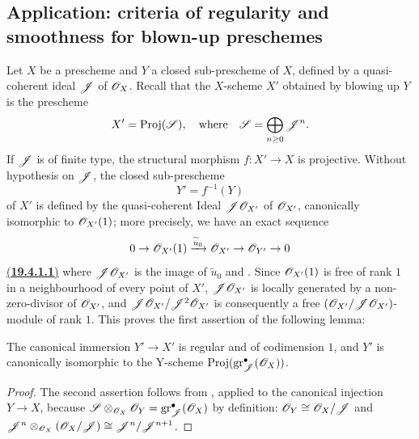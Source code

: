 \subsection{Application: criteria of regularity and smoothness for blown-up preschemes}
\label{subsection:IV.19.4}


\begin{env}[19.4.1]
\label{IV.19.4.1}
Let $X$ be a prescheme and $Y$ a closed sub-prescheme of $X$, defined by a quasi-coherent ideal $\mathscr{J}$ of $\mathscr{O}_X$.
Recall  that the $X$-scheme $X'$ obtained by blowing up $Y$ is the prescheme
\[
  X'=\operatorname{Proj}(\mathscr{S}), \quad \text{where}\quad \mathscr{S}=\bigoplus_{n\geq 0}\mathscr{J}^n.
\]
If $\mathscr{J}$ is of finite type, the structural morphism $f:X'\to X$ is projective.
Without hypothesis on $\mathscr{J}$, the closed sub-prescheme
\[
  Y'=f^{-1}(Y)
\]
of $X'$ is defined by the quasi-coherent Ideal $\mathscr{J}\mathscr{O}_{X'}$ of $\mathscr{O}_{X'}$, canonically isomorphic to $\mathscr{O}_{X'}(1)$; more precisely, we have an exact sequence
\[
  0\to\mathscr{O}_{X'}(1)\xrightarrow{\widetilde{u}_0}\mathscr{O}_{X'}\to\mathscr{O}_{Y'}\to 0
\]
{\hyperref[IV.19.4.1.1]{(\textbf{19.4.1.1})}}
where $\mathscr{J}\mathscr{O}_{X'}$ is the image of $\widetilde{u}_0$  and .
Since $\mathscr{O}_{X'}(1)$ is free of rank $1$ in a neighbourhood of every point of $X'$, $\mathscr{J}\mathscr{O}_{X'}$ is locally generated by a non-zero-divisor of $\mathscr{O}_{X'}$, and $\mathscr{J}\mathscr{O}_{X'}/\mathscr{J}^2\mathscr{O}_{X'}$ is consequently a free $(\mathscr{O}_{X'}/\mathscr{J}\mathscr{O}_{X'})$-module of rank $1$.
This proves the first assertion of the following lemma:
\end{env}

\begin{lemma}[19.4.2]
\label{IV.19.4.2}
The canonical immersion $Y'\to X'$ is regular and of codimension $1$, and $Y'$ is canonically isomorphic to the Y-scheme $\operatorname{Proj}(\operatorname{gr}_{\mathscr{J}}^\bullet(\mathscr{O}_X))$.
\end{lemma}

\begin{proof}
The second assertion follows from , applied to the canonical injection $Y\to X$, because $\mathscr{S}\otimes_{\mathscr{O}_X}\mathscr{O}_Y=\operatorname{gr}_{\mathscr{J}}^\bullet(\mathscr{O}_X)$
by definition: $\mathscr{O}_Y\cong\mathscr{O}_X/\mathscr{J}$ and $\mathscr{J}^n\otimes_{\mathscr{O}_X}(\mathscr{O}_X/\mathscr{J})\cong\mathscr{J}^n/\mathscr{J}^{n+1}$.
\end{proof}

